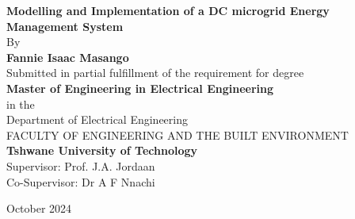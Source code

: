 \begin{titlepage}
	\centering
		\vspace*{1cm}	
			
		{\Large \textbf{Modelling and Implementation of a DC microgrid Energy Management System}	}
		\vspace{0.5cm}	
		\\\relax
		By
		\\\relax	
		\vspace{0.5cm}
		\textbf{Fannie Isaac Masango\\}
		\vspace{2cm}		
		Submitted in partial fulfillment of the requirement for degree\\\relax
		\textbf{Master of Engineering in Electrical Engineering\\\relax}
		\vspace{0.8cm}
		in the\\	
		Department of Electrical Engineering\\\relax
		\vspace{1.5cm}
		FACULTY OF ENGINEERING AND THE BUILT ENVIRONMENT\\\relax
		\textbf{Tshwane University of Technology\\\relax}
		\vspace{1.5cm}
		Supervisor: Prof. J.A. Jordaan\\\relax
		Co-Supervisor: Dr A F Nnachi\par
		\vspace{2.5cm}
		October 2024
		\setcounter{page}{0}		%
\end{titlepage} 		%
